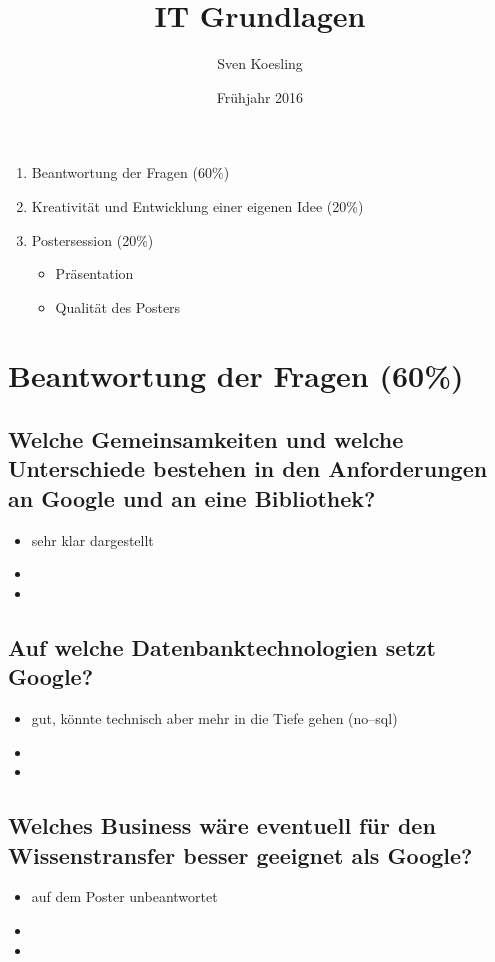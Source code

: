 \documentclass[german,headsepline]{scrartcl}
\title{IT Grundlagen}
\author{Sven Koesling}
\date{Frühjahr 2016}
\begin{document}
\begin{enumerate}
  \item Beantwortung der Fragen (60\%)
  \item Kreativität und Entwicklung einer eigenen Idee (20\%)
  \item Postersession (20\%)
  \begin{itemize}
    \item Präsentation
    \item Qualität des Posters
  \end{itemize}
\end{enumerate}
  
\section{Beantwortung der Fragen (60\%)}
\subsection{Welche Gemeinsamkeiten und welche Unterschiede bestehen in den Anforderungen an Google und an
eine Bibliothek?}
\begin{itemize}
  \item sehr klar dargestellt
  \item 
  \item
\end{itemize}

\subsection{Auf welche Datenbanktechnologien setzt Google?}
\begin{itemize}
  \item gut, könnte technisch aber mehr in die Tiefe gehen (no--sql)
  \item 
  \item
\end{itemize}

\subsection{Welches Business wäre eventuell für den Wissenstransfer besser geeignet als Google?}
\begin{itemize}
  \item auf dem Poster unbeantwortet
  \item 
  \item
\end{itemize}
\end{document}
